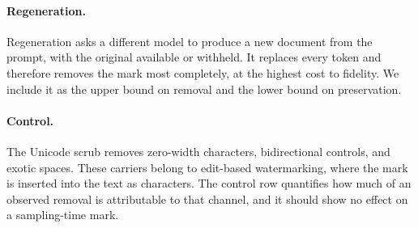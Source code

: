 \paragraph{Regeneration.}
Regeneration asks a different model to produce a new document from the prompt, with the original available or withheld. It replaces every token and therefore removes the mark most completely, at the highest cost to fidelity. We include it as the upper bound on removal and the lower bound on preservation.

\paragraph{Control.}
The Unicode scrub removes zero-width characters, bidirectional controls, and exotic spaces. These carriers belong to edit-based watermarking, where the mark is inserted into the text as characters. The control row quantifies how much of an observed removal is attributable to that channel, and it should show no effect on a sampling-time mark.
